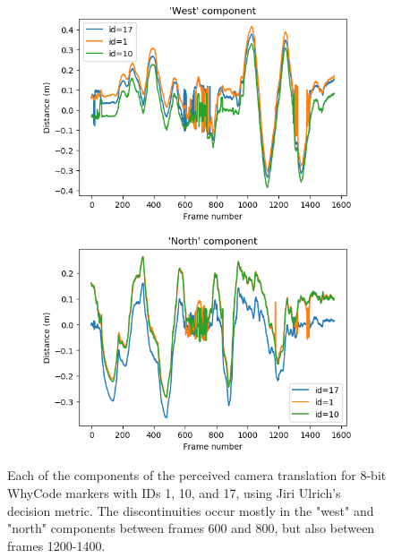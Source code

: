 \begin{figure}
    \begin{subfigure}[b]{0.49\textwidth}
         \centering
         \includegraphics[width=\textwidth]{images/jiri.csv_figure_w}
    \end{subfigure}
    \hfill
    \begin{subfigure}[b]{0.49\textwidth}
         \centering
         \includegraphics[width=\textwidth]{images/jiri.csv_figure_n}
    \end{subfigure}

    \caption{Each of the components of the perceived camera translation for 8-bit WhyCode markers with IDs 1, 10, and 17, using Jiri Ulrich's decision metric.
    The discontinuities occur mostly in the "west" and "north" components between frames 600 and 800, but also between frames 1200-1400.}
    \label{figure:jiri_uwn}
\end{figure}

